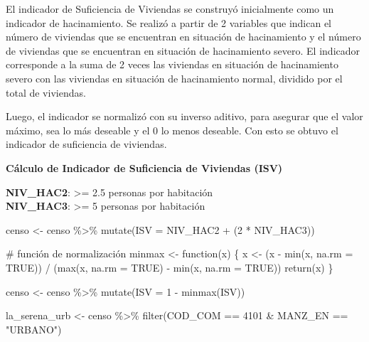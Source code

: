 \documentclass[
  letterpaper,
  DIV=11,
  numbers=noendperiod]{scrreprt}
\newenvironment{Shaded}{\begin{snugshade}}{\end{snugshade}}
\newcommand{\AttributeTok}[1]{\textcolor[rgb]{0.40,0.45,0.13}{#1}}
\newcommand{\CommentTok}[1]{\textcolor[rgb]{0.37,0.37,0.37}{#1}}
\newcommand{\ConstantTok}[1]{\textcolor[rgb]{0.56,0.35,0.01}{#1}}
\newcommand{\ControlFlowTok}[1]{\textcolor[rgb]{0.00,0.23,0.31}{#1}}
\newcommand{\DecValTok}[1]{\textcolor[rgb]{0.68,0.00,0.00}{#1}}
\newcommand{\FunctionTok}[1]{\textcolor[rgb]{0.28,0.35,0.67}{#1}}
\newcommand{\NormalTok}[1]{\textcolor[rgb]{0.00,0.23,0.31}{#1}}
\newcommand{\OtherTok}[1]{\textcolor[rgb]{0.00,0.23,0.31}{#1}}
\newcommand{\SpecialCharTok}[1]{\textcolor[rgb]{0.37,0.37,0.37}{#1}}
\newcommand{\StringTok}[1]{\textcolor[rgb]{0.13,0.47,0.30}{#1}}
\begin{document}
El indicador de Suficiencia de Viviendas se construyó inicialmente como
un indicador de hacinamiento. Se realizó a partir de 2 variables que
indican el número de viviendas que se encuentran en situación de
hacinamiento y el número de viviendas que se encuentran en situación de
hacinamiento severo. El indicador corresponde a la suma de 2 veces las
viviendas en situación de hacinamiento severo con las viviendas en
situación de hacinamiento normal, dividido por el total de viviendas.

Luego, el indicador se normalizó con su inverso aditivo, para asegurar
que el valor máximo, sea lo más deseable y el 0 lo menos deseable. Con
esto se obtuvo el indicador de suficiencia de viviendas.

\textbf{Cálculo de Indicador de Suficiencia de Viviendas (ISV) }

\textbf{NIV\_HAC2}: \textgreater= 2.5 personas por habitación\\
\textbf{NIV\_HAC3}: \textgreater= 5 personas por habitación

\begin{Shaded}
\begin{Highlighting}[]
\NormalTok{censo }\OtherTok{\textless{}{-}}\NormalTok{ censo }\SpecialCharTok{\%\textgreater{}\%} \FunctionTok{mutate}\NormalTok{(}\AttributeTok{ISV =}\NormalTok{ NIV\_HAC2 }\SpecialCharTok{+}\NormalTok{ (}\DecValTok{2} \SpecialCharTok{*}\NormalTok{ NIV\_HAC3))}

\CommentTok{\# función de normalización}
\NormalTok{minmax }\OtherTok{\textless{}{-}} \ControlFlowTok{function}\NormalTok{(x) \{}
\NormalTok{  x }\OtherTok{\textless{}{-}}\NormalTok{ (x }\SpecialCharTok{{-}} \FunctionTok{min}\NormalTok{(x, }\AttributeTok{na.rm =} \ConstantTok{TRUE}\NormalTok{)) }\SpecialCharTok{/} 
\NormalTok{    (}\FunctionTok{max}\NormalTok{(x, }\AttributeTok{na.rm =} \ConstantTok{TRUE}\NormalTok{) }\SpecialCharTok{{-}} \FunctionTok{min}\NormalTok{(x, }\AttributeTok{na.rm =} \ConstantTok{TRUE}\NormalTok{))}
  \FunctionTok{return}\NormalTok{(x)}
\NormalTok{\}}

\NormalTok{censo }\OtherTok{\textless{}{-}}\NormalTok{ censo }\SpecialCharTok{\%\textgreater{}\%} \FunctionTok{mutate}\NormalTok{(}\AttributeTok{ISV =} \DecValTok{1} \SpecialCharTok{{-}} \FunctionTok{minmax}\NormalTok{(ISV))}
\end{Highlighting}
\end{Shaded}

\begin{Shaded}
\begin{Highlighting}[]
\NormalTok{la\_serena\_urb }\OtherTok{\textless{}{-}}\NormalTok{ censo }\SpecialCharTok{\%\textgreater{}\%} \FunctionTok{filter}\NormalTok{(COD\_COM }\SpecialCharTok{==} \DecValTok{4101} \SpecialCharTok{\&}\NormalTok{ MANZ\_EN }\SpecialCharTok{==} \StringTok{"URBANO"}\NormalTok{)}
\end{Highlighting}
\end{Shaded}
\end{document}
